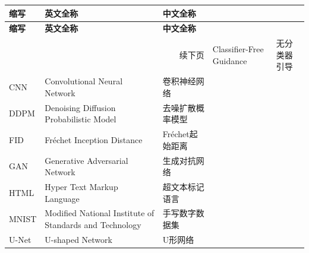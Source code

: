 \begin{abbreviation}

\begin{longtable}[c]{l*{3}{l}}
	\textbf{缩写} & \textbf{英文全称} & \textbf{中文全称} \vspace{6pt}\\
\endfirsthead
	\textbf{缩写} & \textbf{英文全称} & \textbf{中文全称} \vspace{6pt}\\
\endhead
\multicolumn{3}{r}{续下页}
\endfoot
\endlastfoot
    CFG   & Classifier-Free Guidance & 无分类器引导 \\
    CNN   & Convolutional Neural Network & 卷积神经网络 \\
    DDPM  & Denoising Diffusion Probabilistic Model & 去噪扩散概率模型 \\
    FID   & Fr\'{e}chet Inception Distance & Fr\'{e}chet起始距离 \\
    GAN   & Generative Adversarial Network & 生成对抗网络 \\
    HTML  & Hyper Text Markup Language & 超文本标记语言 \\
    MNIST & Modified National Institute of Standards and Technology & 手写数字数据集 \\
    U-Net & U-shaped Network & U形网络 \\

\end{longtable}


\end{abbreviation}

